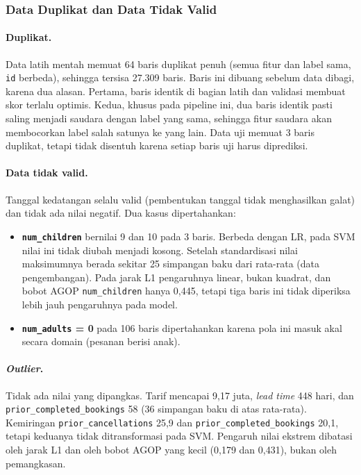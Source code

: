\subsubsection{Data Duplikat dan Data Tidak Valid}
\paragraph{Duplikat.} Data latih mentah memuat 64 baris duplikat penuh (semua fitur dan label sama, \texttt{id} berbeda), sehingga tersisa 27.309 baris. Baris ini dibuang sebelum data dibagi, karena dua alasan. Pertama, baris identik di bagian latih dan validasi membuat skor terlalu optimis. Kedua, khusus pada pipeline ini, dua baris identik pasti saling menjadi saudara dengan label yang sama, sehingga fitur saudara akan membocorkan label salah satunya ke yang lain. Data uji memuat 3 baris duplikat, tetapi tidak disentuh karena setiap baris uji harus diprediksi.

\paragraph{Data tidak valid.} Tanggal kedatangan selalu valid (pembentukan tanggal tidak menghasilkan galat) dan tidak ada nilai negatif. Dua kasus dipertahankan:
\begin{itemize}
	\item \textbf{\texttt{num\_children}} bernilai 9 dan 10 pada 3 baris. Berbeda dengan LR, pada SVM nilai ini tidak diubah menjadi kosong. Setelah standardisasi nilai maksimumnya berada sekitar 25 simpangan baku dari rata-rata (data pengembangan). Pada jarak L1 pengaruhnya linear, bukan kuadrat, dan bobot AGOP \texttt{num\_children} hanya 0,445, tetapi tiga baris ini tidak diperiksa lebih jauh pengaruhnya pada model.
	\item \textbf{\texttt{num\_adults} = 0} pada 106 baris dipertahankan karena pola ini masuk akal secara domain (pesanan berisi anak).
\end{itemize}

\paragraph{\textit{Outlier}.} Tidak ada nilai yang dipangkas. Tarif mencapai 9,17 juta, \textit{lead time} 448 hari, dan \texttt{prior\_completed\_bookings} 58 (36 simpangan baku di atas rata-rata). Kemiringan \texttt{prior\_cancellations} 25,9 dan \texttt{prior\_completed\_bookings} 20,1, tetapi keduanya tidak ditransformasi pada SVM. Pengaruh nilai ekstrem dibatasi oleh jarak L1 dan oleh bobot AGOP yang kecil (0,179 dan 0,431), bukan oleh pemangkasan.

